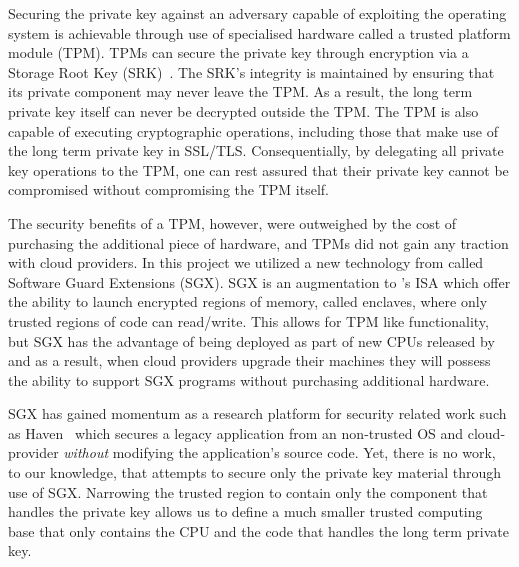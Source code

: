 \documentclass[../main.tex]{subfiles}
\begin{document}
Securing the private key against an adversary capable of exploiting
the operating system is achievable through use of specialised hardware
called a trusted platform module (TPM). TPMs can secure the private
key through encryption via a Storage Root Key (SRK)~\cite{tpm10}. The
SRK's integrity is maintained by ensuring that its private component
may never leave the TPM. As a result, the long term private key itself
can never be decrypted outside the TPM. The TPM is also capable of
executing cryptographic operations, including those that make use of
the long term private key in SSL/TLS. Consequentially, by delegating
all private key operations to the TPM, one can rest assured that their
private key cannot be compromised without compromising the TPM itself.

The security benefits of a TPM, however, were outweighed by the cost
of purchasing the additional piece of hardware, and TPMs did not gain
any traction with cloud providers. In this project we utilized a new
technology from \Intel called Software Guard Extensions (SGX). SGX is
an augmentation to \Intel's ISA which offer the ability to launch
encrypted regions of memory, called enclaves, where only trusted
regions of code can read/write. This allows for TPM like
functionality, but SGX has the advantage of being deployed as part of
new CPUs released by \Intel and as a result, when cloud providers
upgrade their machines they will possess the ability to support SGX
programs without purchasing additional hardware.

SGX has gained momentum as a research platform for security related
work such as Haven~\cite{Baumann14} which secures a legacy application
from an non-trusted OS and cloud-provider \textit{without} modifying
the application's source code.  Yet, there is no work, to our
knowledge, that attempts to secure only the private key material
through use of SGX. Narrowing the trusted region to contain only the
component that handles the private key allows us to define a much
smaller trusted computing base that only contains the CPU and the code
that handles the long term private key. 
\end{document}
